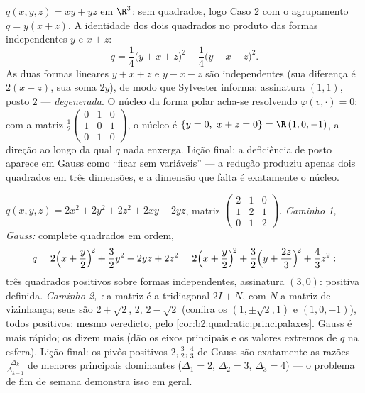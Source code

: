 \begin{example}\label{ex:b2:quadratic:degenerate}
$q(x, y, z) = xy + yz$ em $\R^3$: sem quadrados, logo Caso 2 com o
agrupamento $q = y(x + z)$. A identidade dos dois quadrados no produto
das formas independentes $y$ e $x + z$:
\[
q = \frac14\bigl(y + x + z\bigr)^2 -
\frac14\bigl(y - x - z\bigr)^2 .
\]
As duas formas lineares $y + x + z$ e $y - x - z$ são
independentes (sua diferença é $2(x+z)$, sua soma $2y$), de modo que
Sylvester informa: assinatura $(1, 1)$, posto $2$ ---
\emph{degenerada}. O núcleo da forma polar acha-se
resolvendo $\varphi(v, \cdot) = 0$: com a matriz
$\frac12\begin{pmatrix} 0&1&0\\ 1&0&1\\ 0&1&0\end{pmatrix}$,
o núcleo é $\{y = 0,\ x + z = 0\} = \R\,(1, 0, -1)$, a
direção ao longo da qual $q$ nada enxerga. Lição final: a
deficiência de posto aparece em Gauss como ``ficar sem variáveis''
--- a redução produziu apenas dois quadrados em três
dimensões, e a dimensão que falta é exatamente o núcleo.
\end{example}

\begin{example}\label{ex:b2:quadratic:tworoads}
$q(x, y, z) = 2x^2 + 2y^2 + 2z^2 + 2xy + 2yz$, matriz
$\begin{pmatrix} 2 & 1 & 0\\ 1 & 2 & 1\\ 0 & 1 & 2
\end{pmatrix}$. \emph{Caminho 1, Gauss:} complete quadrados em
ordem,
\[
q = 2\Bigl(x + \frac y2\Bigr)^{\!2} + \frac32 y^2 + 2yz + 2z^2
= 2\Bigl(x + \frac y2\Bigr)^{\!2}
+ \frac32\Bigl(y + \frac{2z}{3}\Bigr)^{\!2} + \frac43 z^2 :
\]
três quadrados positivos sobre formas independentes, assinatura $(3,
0)$: positiva definida. \emph{Caminho 2, :} a matriz
é a tridiagonal $2I + N$, com $N$ a matriz de vizinhança; seus
 são $2 + \sqrt2$, $2$, $2 - \sqrt2$ (confira os
 $(1, \pm\sqrt2, 1)$ e $(1, 0, -1)$), todos
positivos: mesmo veredicto, pelo
\cref{cor:b2:quadratic:principalaxes}. Gauss é mais rápido;
os  dizem mais (dão os eixos principais e os
valores extremos de $q$ na esfera). Lição final: os
pivôs positivos $2, \frac32, \frac43$ de Gauss são exatamente as
razões $\frac{\Delta_k}{\Delta_{k-1}}$ de menores principais
dominantes ($\Delta_1 = 2$, $\Delta_2 = 3$, $\Delta_3 = 4$) --- o
problema de fim de semana demonstra isso em geral.
\end{example}

